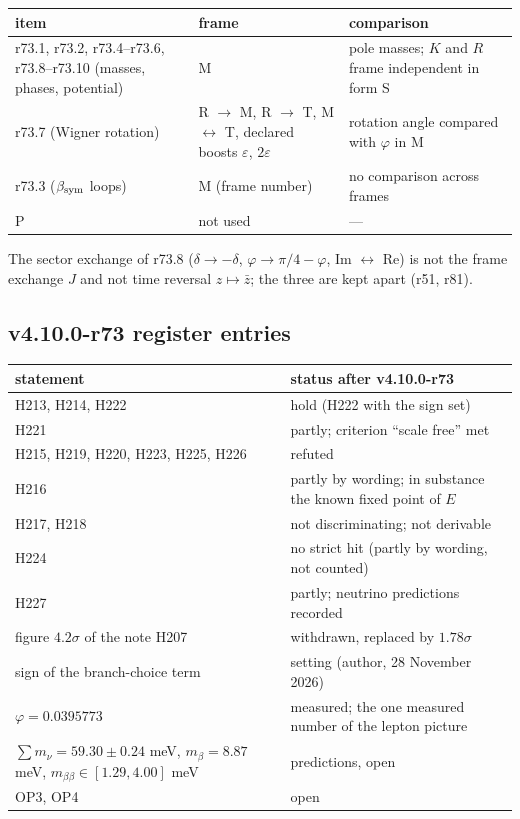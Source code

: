 \begin{center}
\small
\begin{tabular}{@{}>{\raggedright\arraybackslash}p{}>{\raggedright\arraybackslash}p{}>{\raggedright\arraybackslash}p{}@{}}
\toprule
item & frame & comparison\\
\midrule
r73.1, r73.2, r73.4--r73.6, r73.8--r73.10 (masses, phases, potential) & M & pole masses; \(K\) and \(R\) frame independent in form S\\
r73.7 (Wigner rotation) & R \(\to\) M, R \(\to\) T, M \(\leftrightarrow\) T, declared boosts \(\varepsilon\), \(2\varepsilon\) & rotation angle compared with \(\varphi\) in M\\
r73.3 (\(\beta_{\rm sym}\) loops) & M (frame number) & no comparison across frames\\
P & not used & ---\\
\bottomrule
\end{tabular}
\end{center}
The sector exchange of r73.8 (\(\delta\to-\delta\), \(\varphi\to\pi/4-\varphi\), Im \(\leftrightarrow\) Re) is not the frame exchange \(J\) and not time
reversal \(z\mapsto\bar z\); the three are kept apart (r51, r81).

\subsection*{v4.10.0-r73 register entries}
\label{subsec:v4100-r73-register}

\begin{center}
\small
\begin{tabular}{@{}>{\raggedright\arraybackslash}p{}>{\raggedright\arraybackslash}p{}@{}}
\toprule
statement & status after v4.10.0-r73\\
\midrule
H213, H214, H222 & hold (H222 with the sign set)\\
H221 & partly; criterion ``scale free'' met\\
H215, H219, H220, H223, H225, H226 & refuted\\
H216 & partly by wording; in substance the known fixed point of \(E\)\\
H217, H218 & not discriminating; not derivable\\
H224 & no strict hit (partly by wording, not counted)\\
H227 & partly; neutrino predictions recorded\\
figure \(4.2\sigma\) of the note H207 & withdrawn, replaced by \(1.78\sigma\)\\
sign of the branch-choice term & setting (author, 28 November 2026)\\
\(\varphi=0.0395773\) & measured; the one measured number of the lepton picture\\
\(\sum m_\nu=59.30\pm0.24\) meV, \(m_\beta=8.87\) meV, \(m_{\beta\beta}\in[1.29,4.00]\) meV & predictions, open\\
OP3, OP4 & open\\
\bottomrule
\end{tabular}
\end{center}

